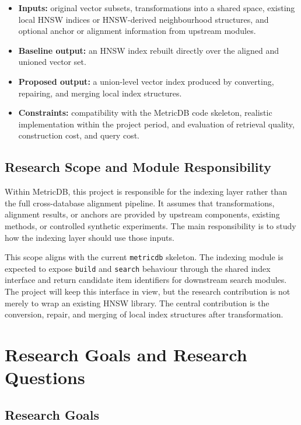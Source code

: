 \documentclass[11pt]{article}
\begin{document}
\begin{itemize}
\item \textbf{Inputs:} original vector subsets, transformations into a shared space, existing local HNSW indices or HNSW-derived neighbourhood structures, and optional anchor or alignment information from upstream modules.
\item \textbf{Baseline output:} an HNSW index rebuilt directly over the aligned and unioned vector set.
\item \textbf{Proposed output:} a union-level vector index produced by converting, repairing, and merging local index structures.
\item \textbf{Constraints:} compatibility with the MetricDB code skeleton, realistic implementation within the project period, and evaluation of retrieval quality, construction cost, and query cost.
\end{itemize}

\subsection{Research Scope and Module Responsibility}

Within MetricDB, this project is responsible for the indexing layer rather than the full cross-database alignment pipeline. It assumes that transformations, alignment results, or anchors are provided by upstream components, existing methods, or controlled synthetic experiments. The main responsibility is to study how the indexing layer should use those inputs.

This scope aligns with the current \texttt{metricdb} skeleton. The indexing module is expected to expose \texttt{build} and \texttt{search} behaviour through the shared index interface and return candidate item identifiers for downstream search modules. The project will keep this interface in view, but the research contribution is not merely to wrap an existing HNSW library. The central contribution is the conversion, repair, and merging of local index structures after transformation.

\section{Research Goals and Research Questions}

\subsection{Research Goals}
\end{document}
